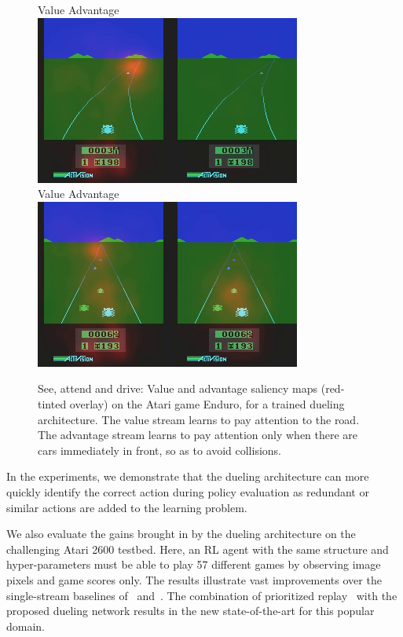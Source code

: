 \begin{figure}[t!]
\begin{center}
{\sc \small \hspace{0.6cm} Value \hspace{1.8cm} Advantage } \\
	\includegraphics[scale=0.55]{./figs/enduro_color_1} \\
{\sc \small \hspace{0.6cm} Value \hspace{1.8cm} Advantage } \\
	\includegraphics[scale=0.55]{./figs/enduro_color_2}
\end{center}
\caption{See, attend and drive: Value and advantage saliency maps (red-tinted overlay) on the Atari game Enduro, for a trained dueling architecture. The value stream learns to pay attention to the road. The advantage stream learns to pay attention only when there are cars immediately in front, so as to avoid collisions.}  
\label{fig:saliency}
\end{figure}

In the experiments, we demonstrate that the dueling architecture can more quickly identify the correct action during policy evaluation as redundant or similar actions are added to the learning problem. 

We also evaluate the gains brought in by the dueling architecture on the challenging Atari 2600 testbed. Here, an RL agent with the same structure and hyper-parameters must be able to play 57 different games by observing image pixels and game scores only. The results illustrate vast improvements over the single-stream baselines of~\citet{Mnih:2015} and~\citet{vanHasselt:2015}. The combination of
prioritized replay~\citep{Schaul:2015} with the proposed dueling network results in the new state-of-the-art for this popular domain.


